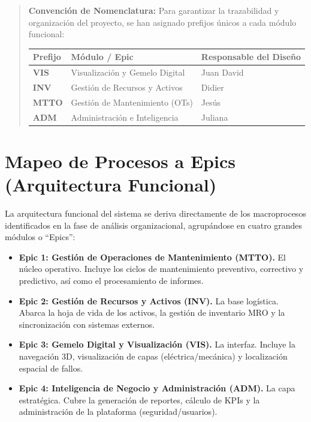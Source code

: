 \documentclass[12pt, a4paper]{article}
\begin{document}
\begin{quote}
\textbf{Convención de Nomenclatura:}
Para garantizar la trazabilidad y organización del proyecto, se han asignado prefijos únicos a cada módulo funcional:

\begin{center}
\begin{tabular}{|l|l|l|}
\hline
\textbf{Prefijo} & \textbf{Módulo / Epic} & \textbf{Responsable del Diseño} \\ \hline
\textbf{VIS} & Visualización y Gemelo Digital & Juan David \\ \hline
\textbf{INV} & Gestión de Recursos y Activos & Didier \\ \hline
\textbf{MTTO} & Gestión de Mantenimiento (OTs) & Jesús \\ \hline
\textbf{ADM} & Administración e Inteligencia & Juliana \\ \hline
\end{tabular}
\end{center}
\end{quote}

\section{Mapeo de Procesos a Epics (Arquitectura Funcional)}

La arquitectura funcional del sistema se deriva directamente de los macroprocesos identificados en la fase de análisis organizacional, agrupándose en cuatro grandes módulos o ``Epics'':

\begin{itemize}
    \item \textbf{Epic 1: Gestión de Operaciones de Mantenimiento (MTTO).} El núcleo operativo. Incluye los ciclos de mantenimiento preventivo, correctivo y predictivo, así como el procesamiento de informes.
    \item \textbf{Epic 2: Gestión de Recursos y Activos (INV).} La base logística. Abarca la hoja de vida de los activos, la gestión de inventario MRO y la sincronización con sistemas externos.
    \item \textbf{Epic 3: Gemelo Digital y Visualización (VIS).} La interfaz. Incluye la navegación 3D, visualización de capas (eléctrica/mecánica) y localización espacial de fallos.
    \item \textbf{Epic 4: Inteligencia de Negocio y Administración (ADM).} La capa estratégica. Cubre la generación de reportes, cálculo de KPIs y la administración de la plataforma (seguridad/usuarios).
\end{itemize}
\end{document}
